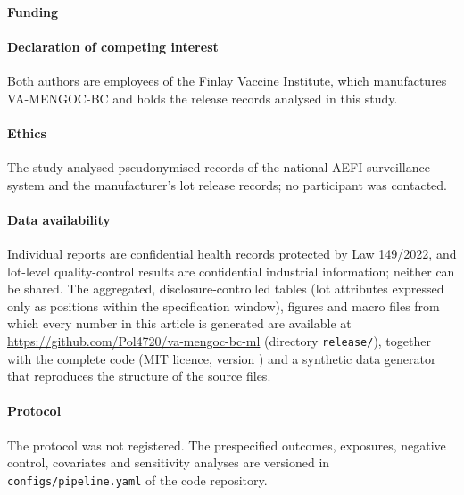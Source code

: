 \small
\paragraph{Funding} 

\paragraph{Declaration of competing interest} Both authors are employees of the Finlay Vaccine
Institute, which manufactures VA-MENGOC-BC and holds the release records analysed in this study.

\paragraph{Ethics} The study analysed pseudonymised records of the national AEFI surveillance system
and the manufacturer's lot release records; no participant was contacted. 

\paragraph{Data availability} Individual reports are confidential health records protected by Law
149/2022, and lot-level quality-control results are confidential industrial information; neither can
be shared. The aggregated, disclosure-controlled tables (lot attributes expressed only as positions
within the specification window), figures and macro files from which every number in this article is
generated are available at \url{https://github.com/Pol4720/va-mengoc-bc-ml} (directory
\texttt{release/}), together with the complete code (MIT licence, version \VCodeVersion) and a
synthetic data generator that reproduces the structure of the source files.

\paragraph{Protocol} The protocol was not registered. The prespecified outcomes, exposures,
negative control, covariates and sensitivity analyses are versioned in \texttt{configs/pipeline.yaml}
of the code repository.

